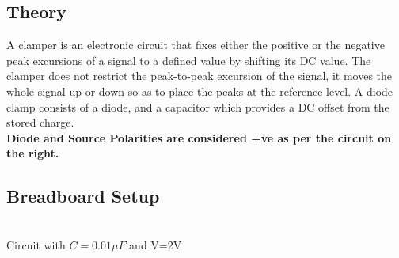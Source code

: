 \documentclass{article}
\begin{document}
\subsection{Theory}
\begin{figure}
\end{figure}
A clamper is an electronic circuit that fixes either the positive or the negative peak excursions of a signal to a defined value by shifting its DC value. The clamper does not restrict the peak-to-peak excursion of the signal, it moves the whole signal up or down so as to place the peaks at the reference level. A diode clamp consists of a diode, and a capacitor which provides a DC offset from the stored charge. \\

\noindent
\textbf{Diode and Source Polarities are considered +ve as per the circuit on the right.}

\subsection{Breadboard Setup}
\vspace{5px}
\begin{center}
 \\ \vspace{5px}
Circuit with $C=0.01 \mu F$ and V=2V\\
\end{center}
\end{document}
